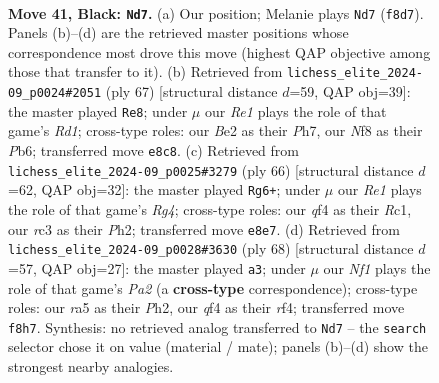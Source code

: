 \documentclass[11pt]{article}
\begin{document}
\clearpage

\begin{figure}[p]\centering
\begin{subfigure}{0.46\textwidth}\centering
\resizebox{\linewidth}{!}{%
\newchessgame
\chessboard[
  setfen={1k2rn2/1p6/1r1p4/R7/4PQ2/1PR5/K3b1PP/8 b - - 0 41},
  showmover=false,
  pgfstyle=straightmove, color=movearrow, markmove={f8-d7}
]}
\caption{}
\end{subfigure}\hfill
\begin{subfigure}{0.46\textwidth}\centering
\resizebox{\linewidth}{!}{%
\newchessgame
\chessboard[
  setfen={3r1k2/5p1p/rp6/1R1P3p/4P3/p7/R4PKP/8 b - - 3 34},
  showmover=false,
  pgfstyle=straightmove, color=movearrow, markmove={d8-e8}
]}
\caption{}
\end{subfigure}
\\[4pt]
\begin{subfigure}{0.46\textwidth}\centering
\resizebox{\linewidth}{!}{%
\newchessgame
\chessboard[
  setfen={2r5/6p1/p2k4/P1p1p3/4P1R1/3rP3/7P/2R3K1 w - - 0 34},
  showmover=false,
  pgfstyle=straightmove, color=movearrow, markmove={g4-g6}
]}
\caption{}
\end{subfigure}\hfill
\begin{subfigure}{0.46\textwidth}\centering
\resizebox{\linewidth}{!}{%
\newchessgame
\chessboard[
  setfen={6k1/3R3p/4r2p/2p5/p4r2/5P2/PP3RKP/8 w - - 0 35},
  showmover=false,
  pgfstyle=straightmove, color=movearrow, markmove={a2-a3}
]}
\caption{}
\end{subfigure}
\caption{\textbf{Move 41, Black: \texttt{Nd7}.} (a) Our position; Melanie plays \texttt{Nd7} (\texttt{f8d7}). Panels (b)--(d) are the retrieved master positions whose correspondence most drove this move (highest QAP objective among those that transfer to it). (b) Retrieved from \texttt{lichess\_elite\_2024-09\_p0024\#2051} (ply 67) [structural distance $d$=59, QAP obj=39]: the master played \texttt{Re8}; under $\mu$ our \emph{Re1} plays the role of that game's \emph{Rd1}; cross-type roles: our \emph{B}e2 as their \emph{P}h7, our \emph{N}f8 as their \emph{P}b6; transferred move \texttt{e8c8}. (c) Retrieved from \texttt{lichess\_elite\_2024-09\_p0025\#3279} (ply 66) [structural distance $d$=62, QAP obj=32]: the master played \texttt{Rg6+}; under $\mu$ our \emph{Re1} plays the role of that game's \emph{Rg4}; cross-type roles: our \emph{q}f4 as their \emph{R}c1, our \emph{r}c3 as their \emph{P}h2; transferred move \texttt{e8e7}. (d) Retrieved from \texttt{lichess\_elite\_2024-09\_p0028\#3630} (ply 68) [structural distance $d$=57, QAP obj=27]: the master played \texttt{a3}; under $\mu$ our \emph{Nf1} plays the role of that game's \emph{Pa2} (a \textbf{cross-type} correspondence); cross-type roles: our \emph{r}a5 as their \emph{P}h2, our \emph{q}f4 as their \emph{r}f4; transferred move \texttt{f8h7}. Synthesis: no retrieved analog transferred to \texttt{Nd7} -- the \texttt{search} selector chose it on value (material / mate); panels (b)--(d) show the strongest nearby analogies.}
\label{fig:thought-m81}
\end{figure}
\end{document}
